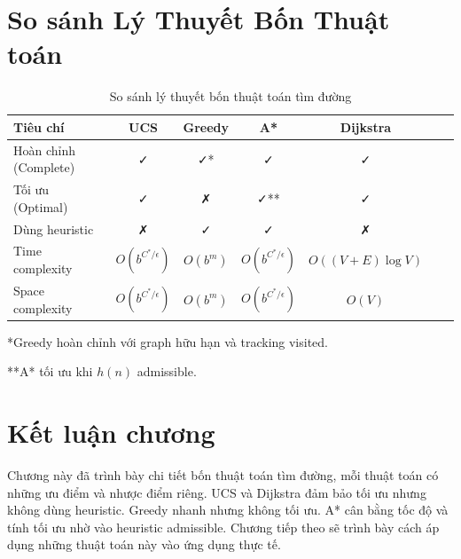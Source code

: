 \section{So sánh Lý Thuyết Bốn Thuật toán}

\begin{table}[H]
  \centering
  \caption{So sánh lý thuyết bốn thuật toán tìm đường}
  \label{tab:comparison}
  \begin{tabular}{lcccccc}
    \toprule
    \textbf{Tiêu chí} & \textbf{UCS} & \textbf{Greedy} & \textbf{A*} & \textbf{Dijkstra} \\
    \midrule
    Hoàn chỉnh (Complete) & ✓ & ✓* & ✓ & ✓ \\
    Tối ưu (Optimal) & ✓ & ✗ & ✓** & ✓ \\
    Dùng heuristic & ✗ & ✓ & ✓ & ✗ \\
    Time complexity & $O(b^{C^*/\epsilon})$ & $O(b^m)$ & $O(b^{C^*/\epsilon})$ & $O((V+E)\log V)$ \\
    Space complexity & $O(b^{C^*/\epsilon})$ & $O(b^m)$ & $O(b^{C^*/\epsilon})$ & $O(V)$ \\
    \bottomrule
  \end{tabular}
\end{table}

*Greedy hoàn chỉnh với graph hữu hạn và tracking visited.

**A* tối ưu khi $h(n)$ admissible.

\section{Kết luận chương}

Chương này đã trình bày chi tiết bốn thuật toán tìm đường, mỗi thuật toán có những ưu điểm và nhược điểm riêng. UCS và Dijkstra đảm bảo tối ưu nhưng không dùng heuristic. Greedy nhanh nhưng không tối ưu. A* cân bằng tốc độ và tính tối ưu nhờ vào heuristic admissible. Chương tiếp theo sẽ trình bày cách áp dụng những thuật toán này vào ứng dụng thực tế.
